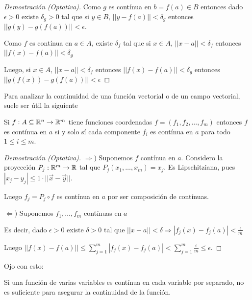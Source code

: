\begin{proof}[Demostración (Optativa)]
Como $g$ es contínua en $b = f(a) \in B$ entonces dado $\epsilon > 0$ existe $\delta_g > 0$ tal que si $y \in B$, $||y - f(a)|| < \delta_g$ entonces $||g(y) - g(f(a))|| < \epsilon$.

Como $f$ es contínua en $a \in A$, existe $\delta_f$ tal que si $x \in A$, $||x-a|| < \delta_f$ entonces $||f(x) - f(a)|| < \delta_g$

Luego, si $x \in A$, $||x-a|| < \delta_f$ entonces $||f(x) - f(a)|| < \delta_g $ entonces $||g(f(x)) - g(f(a))|| < \epsilon$
\end{proof}

Para analizar la continuidad de una función vectorial o de un campo vectorial, suele ser útil la siguiente

\begin{observation}
Si $f : A \subseteq \mathbb{R}^n \to \mathbb{R}^m$ tiene funciones coordenadas $f = (f_1, f_2, \ldots, f_m)$ entonces $f$ es contínua en $a$ si y solo sí cada componente $f_i$ es contínua en $a$ para todo $1 \leq i \leq m$.
\end{observation}

\begin{proof}[Demostración (Optativa)]
$\Rightarrow$) Suponemos $f$ contínua en $a$. Considero la proyección $P_j : \mathbb{R}^m \to \mathbb{R}$ tal que $P_j(x_1, \ldots, x_m) = x_j$.  Es Lipschitziana, pues $|x_j - y_j| \leq 1 \cdot || \vec{x} - \vec{y} ||$.

Luego $f_j = P_j \circ f$ es contínua en $a$ por ser composición de contínuas.

$\Leftarrow$) Suponemos $f_1, \ldots, f_m$ contínuas en $a$

Es decir, dado $\epsilon > 0$ existe $\delta > 0$ tal que $||x-a|| < \delta \Rightarrow |f_j(x) - f_j(a)| < \frac{\epsilon}{m}$

Luego $|| f(x) - f(a) || \leq \sum_{j=1}^m |f_j(x) - f_j(a)| < \sum_{j=1}^m \frac{\epsilon}{m} \leq \epsilon$.
\end{proof}

Ojo con esto:

\begin{observation}
Si una función de varias variables es contínua en cada variable por separado, no es suficiente para asegurar la continuidad de la función.
\end{observation}

